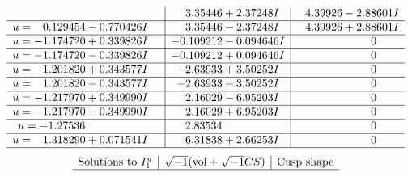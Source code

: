 \documentclass[1p]{elsarticle_modified}
\theoremstyle{definition}
\newcommand{\I}{\sqrt{-1}}
\begin{document}
$$\begin{array}{c|c|c}
 & \phantom{-}3.35446 + 2.37248 I & \phantom{-}4.39926 - 2.88601 I \\ \hline\begin{aligned}
u &= \phantom{-}0.129454 - 0.770426 I\end{aligned}
 & \phantom{-}3.35446 - 2.37248 I & \phantom{-}4.39926 + 2.88601 I \\ \hline\begin{aligned}
u &= -1.174720 + 0.339826 I\end{aligned}
 & -0.109212 - 0.094646 I & \phantom{-0.000000 } 0 \\ \hline\begin{aligned}
u &= -1.174720 - 0.339826 I\end{aligned}
 & -0.109212 + 0.094646 I & \phantom{-0.000000 } 0 \\ \hline\begin{aligned}
u &= \phantom{-}1.201820 + 0.343577 I\end{aligned}
 & -2.63933 + 3.50252 I & \phantom{-0.000000 } 0 \\ \hline\begin{aligned}
u &= \phantom{-}1.201820 - 0.343577 I\end{aligned}
 & -2.63933 - 3.50252 I & \phantom{-0.000000 } 0 \\ \hline\begin{aligned}
u &= -1.217970 + 0.349990 I\end{aligned}
 & \phantom{-}2.16029 - 6.95203 I & \phantom{-0.000000 } 0 \\ \hline\begin{aligned}
u &= -1.217970 - 0.349990 I\end{aligned}
 & \phantom{-}2.16029 + 6.95203 I & \phantom{-0.000000 } 0 \\ \hline\begin{aligned}
u &= -1.27536\phantom{ +0.000000I}\end{aligned}
 & \phantom{-}2.83534\phantom{ +0.000000I} & \phantom{-0.000000 } 0 \\ \hline\begin{aligned}
u &= \phantom{-}1.318290 + 0.071541 I\end{aligned}
 & \phantom{-}6.31838 + 2.66253 I & \phantom{-0.000000 } 0\\
 \hline 
 \end{array}$$\newpage$$\begin{array}{c|c|c}  
\text{Solutions to }I^u_{1}& \I (\text{vol} + \sqrt{-1}CS) & \text{Cusp shape}\\
 \hline 

\end{array}$$
\end{document}
